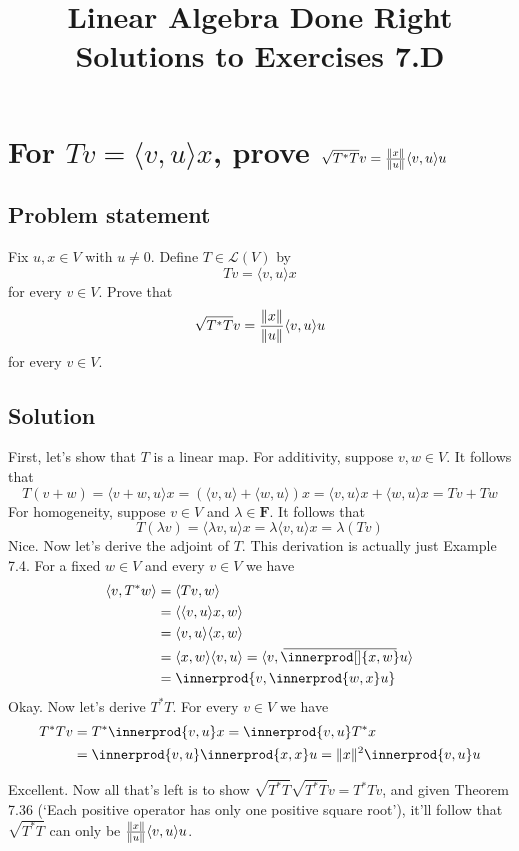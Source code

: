 \documentclass{article}
\title{Linear Algebra Done Right\\Solutions to Exercises 7.D}
\author{}
\date{}
\DeclarePairedDelimiter{\innerprod}\langle\rangle
\newcommand\conjinnerp[2][]{\:\overline{\mkern-4mu\innerprod[#1]{#2}\mkern-4mu}\:}
\begin{document}
\maketitle

\section{For $Tv=\langle v,u\rangle x$, prove $\sqrt{T^*T}v=\frac{\lVert x\rVert}{\lVert u\rVert}\langle v,u\rangle u$}
\subsection*{Problem statement}
Fix $u,x\in V$ with $u\neq 0$. Define $T\in\mathcal{L}(V)$ by
\[Tv=\langle v,u\rangle x\]
for every $v\in V$. Prove that
\[\sqrt{T^*T}v=\frac{\lVert x\rVert}{\lVert u\rVert}\langle v,u\rangle u\]
for every $v\in V$.

\subsection*{Solution}
First, let's show that $T$ is a linear map. For additivity, suppose $v,w\in V$. It follows that
\[T(v+w)=\langle v+w,u\rangle x=(\langle v,u\rangle+\langle w,u\rangle) x=\langle v,u\rangle x+\langle w,u\rangle x=Tv+Tw\]
For homogeneity, suppose $v\in V$ and $\lambda\in \mathbf{F}$. It follows that
\[T(\lambda v)=\langle \lambda v,u\rangle x=\lambda\langle v,u\rangle x=\lambda (Tv)\]
Nice. Now let's derive the adjoint of $T$. This derivation is actually just Example 7.4. For a fixed $w\in V$ and every $v\in V$ we have
\begin{align*}
    \langle v,T^*w\rangle&=\langle Tv,w\rangle\\
    &=\langle \langle v,u\rangle x,w\rangle\\
    &=\langle v,u\rangle\langle x,w\rangle\\
    &=\langle x,w\rangle\langle v,u\rangle=\langle v,\conjinnerp{x,w} u\rangle\\
    &=\innerprod{v,\innerprod{w,x}u}
\end{align*}
Okay. Now let's derive $T^*T$. For every $v\in V$ we have
\begin{align*}
    T^*Tv&=T^*\innerprod{v,u}x=\innerprod{v,u}T^*x\\
    &=\innerprod{v,u}\innerprod{x,x}u=\norm{x}^2\innerprod{v,u}u
\end{align*}

Excellent. Now all that's left is to show $\sqrt{T^*T}\sqrt{T^*T}v=T^*Tv$, and given Theorem 7.36 (`Each positive operator has only one positive square root'), it'll follow that $\sqrt{T^*T}$ can only be $\frac{\lVert x\rVert}{\lVert u\rVert}\langle v,u\rangle u$.
\end{document}
